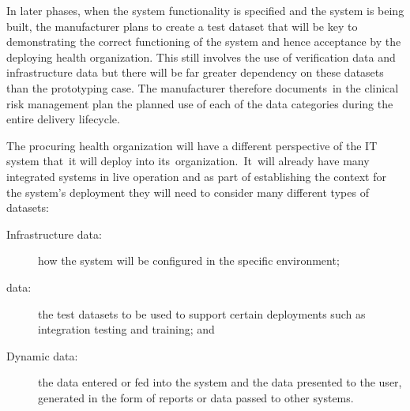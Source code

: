 In later phases, when the system functionality is specified and the system is being built, the manufacturer plans to create a test \gls{dataset} that will be key to demonstrating the correct functioning of the system and hence acceptance by the deploying health organization. This still involves the use of \gls{verification} data and infrastructure data but there will be far greater dependency on these \glspl{dataset} than the prototyping case. The manufacturer therefore documents\cbstart\ in the clinical risk management plan the planned use of each of the data categories during the entire delivery lifecycle\cbend.

\begin{minipage}[t]{0.73\textwidth}
	The procuring health organization will have a different perspective of the IT system that\cbstart\ it will deploy into its\cbend\ organization.\cbstart\ It\cbend\ will already have many integrated systems in live operation and as part of establishing the context for the system's deployment they will need to consider many different types of \glspl{dataset}:
\end{minipage}
\begin{minipage}[t]{0.25\textwidth}
  \centering{}
\end{minipage}
	\begin{description}
		\item[Infrastructure data:] how the system will be configured in the specific environment;
		\item[ data:] the test \glspl{dataset} to be used to support certain deployments such as integration testing and training; and
		\item[Dynamic data:] the data entered or fed into the system and the data presented to the user, generated in the form of reports or data passed to other systems.
	\end{description}

